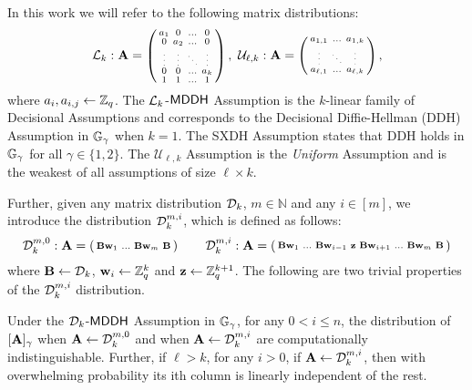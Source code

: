 In this work we will refer to the following matrix distributions: 
\[
\distlin_{k}:\matrA = \left( \begin{smallmatrix}
    a_1 & 0 &  \ldots & 0 \\
    0 &  a_2 &  \ldots & 0\\
    \tiny{\vdots} &  \tiny{\vdots}  &  \tiny{\ddots} & \tiny{\vdots} \\
    0 & 0 &  \ldots  & a_{k}\\
    1 & 1 & \ldots & 1
\end{smallmatrix} \right),
\ 
\mathcal{U}_{\ell,k}: \matrA = \left( \begin{smallmatrix}
    a_{1,1} &  \ldots & a_{1,k}  \\
    \tiny{\vdots} & \tiny{\ddots}  & \tiny{\vdots} \\
    a_{\ell,1} &  \ldots &  a_{\ell,k} 
\end{smallmatrix} \right),
\]
where $a_i,a_{i,j}\leftarrow \mathbb{Z}_q$.  The $\mathcal{L}_{k}$-$\mathsf{MDDH}$ Assumption is the $k$-linear family of Decisional Assumptions
and corresponds to 
 the Decisional Diffie-Hellman (DDH)
Assumption in $\mathbb{G}_\gamma$ when $k=1$. The SXDH Assumption states that DDH holds in $\mathbb{G}_\gamma$ for all $\gamma \in \{1,2\}$. The $\mathcal{U}_{\ell,k}$ Assumption is the \textit{Uniform} Assumption and is the weakest of all assumptions of size $\ell \times k$. 

Further, given any matrix distribution $\mathcal{D}_{k}$, $m \in \mathbb{N}$ and any $i \in [m]$, we introduce the distribution $\mathcal{D}_k^{m,i}$, which is defined as follows: 
\[ \mathcal{D}_k^{m,0}: \mathbf{{A}} = \left(\begin{smallmatrix} \mathbf{{B}}\mathbf{w}_1 & \ldots &  
  \mathbf{{B}}\mathbf{w}_{m} & \mathbf{{B}}  \end{smallmatrix} \right)  \qquad
\mathcal{D}_k^{m,i}:\mathbf{{A}} = \left(\begin{smallmatrix} \mathbf{{B}}\mathbf{w}_1 & \ldots & \mathbf{{B}}\mathbf{w}_{i-1} 
& \mathbf{z} &  \mathbf{{B}}\mathbf{w}_{i+1} & \ldots &  
  \mathbf{{B}}\mathbf{w}_{m} & \mathbf{{B}}  \end{smallmatrix} \right) 
\]
where $\mathbf{{B}} \leftarrow \mathcal{D}_{k}$, $\mathbf{w}_i \leftarrow \mathbb{Z}_q^k$ and $\mathbf{z} \leftarrow \mathbb{Z}_q^{k+1}$. The following are two trivial properties of the $\mathcal{D}_k^{m,i}$ distribution. 

\begin{lemma} Under the $\mathcal{D}_{k}$-$\mathsf{MDDH}$ Assumption in $\mathbb{G}_\gamma$, for any $0 < i \leq n$, the distribution of  $[\mathbf{{A}}]_\gamma$ when $\mathbf{{A}} \leftarrow \mathcal{D}_k^{m,0}$ and when $\mathbf{{A}} \leftarrow \mathcal{D}_k^{m,i}$ are computationally indistinguishable. Further, if $\ell>k$, for any $i>0$, if $\mathbf{{A}} \leftarrow \mathcal{D}_k^{m,i}$, then with overwhelming probability its ith column is linearly independent of the rest. \label{lemma:dist-i}
\end{lemma}

